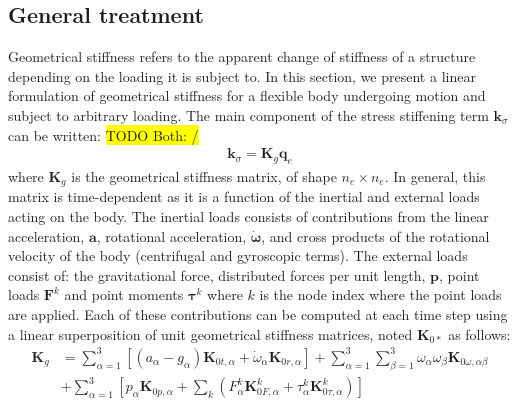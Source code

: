 \documentclass[wes, manuscript]{copernicus}
\renewcommand{\v}[1]{\boldsymbol{#1}}
\newcommand{\m}[1]{\boldsymbol{#1}}
\newcommand{\todoBoth}    [1]{{\colorbox{yellow}{TODO Both:    }}{\color{red}{#1}}\colorbox{yellow}{/}}
\begin{document}
\subsection{General treatment}
Geometrical stiffness refers to the apparent change of stiffness of a structure depending on the loading it is subject to.
In this section, we present a linear formulation of geometrical stiffness for a flexible body undergoing motion and subject to arbitrary loading. 
The main component of the stress stiffening term $\v{k}_\sigma$ can be written:
\todoBoth{I'm not so sure about the term "stress stiffening" any more.}
\begin{align}
  \v{k}_\sigma = \m{K}_g  \v{q}_e
\end{align}
where $\m{K}_g$ is the geometrical stiffness matrix, of shape $n_e\times n_e$.
In general, this matrix is time-dependent as it is a function of the inertial and external loads acting on the body.
The inertial loads consists of contributions from the linear acceleration, $\v{a}$, rotational acceleration, $\v{\dot{\omega}}$, and cross products of the rotational velocity of the body (centrifugal and gyroscopic terms).
% 
The external loads consist of: the gravitational force, distributed forces per unit length, $\v{p}$, point loads $\v{F}^k$ and point moments $\v{\tau}^k$ where $k$ is the node index where the point loads are applied. Each of these contributions can be computed at each time step using a linear superposition of unit geometrical stiffness matrices, noted $\m{K}_{0*}$ as follows:
\begin{align}
    \m{K}_g &= 
    \sum\limits_{\alpha=1}^3 \left[ 
      \left(a_\alpha - g_\alpha \right) \m{K}_{0t,\alpha}
     + \dot{\omega}_\alpha \m{K}_{0r,\alpha}
     \right]
     + \sum\limits_{\alpha=1}^3\sum\limits_{\beta=1}^3  \omega_\alpha\omega_\beta \m{K}_{0\omega,\alpha\beta} 
      \nonumber\\
      &
      + \sum\limits_{\alpha=1}^3   \left[
       p_\alpha \m{K}_{0p,\alpha}
      + \sum\limits_{k} 
         \left (  F_\alpha^k \m{K}_{0F,\alpha}^k +\tau_\alpha^k \m{K}_{0\tau,\alpha}^k\right)
       \right]
       \label{eq:GeomStiff}
\end{align}
\end{document}
